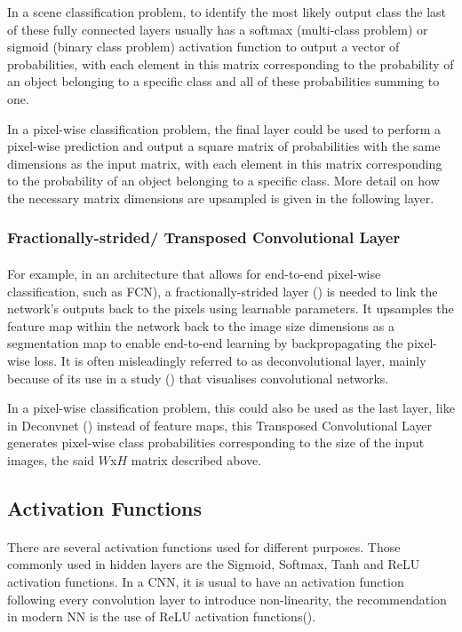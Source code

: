 In a scene classification problem, to identify the most likely output class the last of these fully connected layers usually has a softmax (multi-class problem) or sigmoid (binary class problem) activation function to output a vector of probabilities, with each element in this matrix corresponding to the probability of an object belonging to a specific class and all of these probabilities summing to one.

In a pixel-wise classification problem, the final layer could be used to perform a pixel-wise prediction and output a square matrix of probabilities with the same dimensions as the input matrix, with each element in this matrix corresponding to the probability of an object belonging to a specific class. More detail on how the necessary matrix dimensions are upsampled is given in the following layer.

\subsubsection{Fractionally-strided/ Transposed Convolutional Layer}
\paragraph{}
For example, in an architecture that allows for end-to-end pixel-wise classification, such as \gls{FCN}), a fractionally-strided layer (\cite{long2015fully}) is needed to link the network's outputs back to the pixels using learnable parameters. It upsamples the feature map within the network back to the image size dimensions as a segmentation map to enable end-to-end learning by backpropagating the pixel-wise loss. It is often misleadingly referred to as deconvolutional layer, mainly because of its use in a study (\cite{zeiler2013visualizing}) that visualises convolutional networks. 

In a pixel-wise classification problem, this could also be used as the last layer, like in Deconvnet (\cite{7410535}) instead of feature maps, this Transposed Convolutional Layer generates pixel-wise class probabilities corresponding to the size of the input images, the said $W$x$H$ matrix described above.

\subsection{Activation Functions} \label{cnn_activation}
\paragraph{}
There are several activation functions used for different purposes. Those commonly used in hidden layers are the Sigmoid, Softmax, Tanh and \gls{ReLU} activation functions.
In a \gls{CNN}, it is usual to have an activation function following every convolution layer to introduce non-linearity, the recommendation in modern \gls{NN} is the use of \gls{ReLU} activation functions(\cite{GoodBengCour16}).

